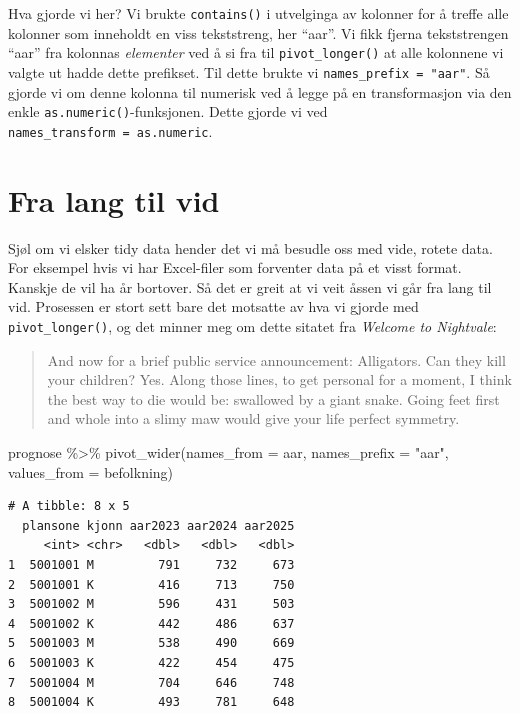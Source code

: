 \documentclass[
  letterpaper,
  DIV=11,
  numbers=noendperiod]{scrreprt}
\newenvironment{Shaded}{\begin{snugshade}}{\end{snugshade}}
\newcommand{\AttributeTok}[1]{\textcolor[rgb]{0.40,0.45,0.13}{#1}}
\newcommand{\FunctionTok}[1]{\textcolor[rgb]{0.28,0.35,0.67}{#1}}
\newcommand{\NormalTok}[1]{\textcolor[rgb]{0.00,0.23,0.31}{#1}}
\newcommand{\SpecialCharTok}[1]{\textcolor[rgb]{0.37,0.37,0.37}{#1}}
\newcommand{\StringTok}[1]{\textcolor[rgb]{0.13,0.47,0.30}{#1}}
\begin{document}
Hva gjorde vi her? Vi brukte \texttt{contains()} i utvelginga av
kolonner for å treffe alle kolonner som inneholdt en viss tekststreng,
her ``aar''. Vi fikk fjerna tekststrengen ``aar'' fra kolonnas
\emph{elementer} ved å si fra til \texttt{pivot\_longer()} at alle
kolonnene vi valgte ut hadde dette prefikset. Til dette brukte vi
\texttt{names\_prefix\ =\ "aar"}. Så gjorde vi om denne kolonna til
numerisk ved å legge på en transformasjon via den enkle
\texttt{as.numeric()}-funksjonen. Dette gjorde vi ved
\texttt{names\_transform\ =\ as.numeric}.

\hypertarget{fra-lang-til-vid}{%
\section{Fra lang til vid}\label{fra-lang-til-vid}}

Sjøl om vi elsker tidy data hender det vi må besudle oss med vide,
rotete data. For eksempel hvis vi har Excel-filer som forventer data på
et visst format. Kanskje de vil ha år bortover. Så det er greit at vi
veit åssen vi går fra lang til vid. Prosessen er stort sett bare det
motsatte av hva vi gjorde med \texttt{pivot\_longer()}, og det minner
meg om dette sitatet fra \emph{Welcome to Nightvale}:

\begin{quote}
And now for a brief public service announcement: Alligators. Can they
kill your children? Yes. Along those lines, to get personal for a
moment, I think the best way to die would be: swallowed by a giant
snake. Going feet first and whole into a slimy maw would give your life
perfect symmetry.
\end{quote}

\begin{Shaded}
\begin{Highlighting}[]
\NormalTok{prognose }\SpecialCharTok{\%\textgreater{}\%} \FunctionTok{pivot\_wider}\NormalTok{(}\AttributeTok{names\_from =}\NormalTok{ aar,}
                         \AttributeTok{names\_prefix =} \StringTok{"aar"}\NormalTok{,}
                         \AttributeTok{values\_from =}\NormalTok{ befolkning)}
\end{Highlighting}
\end{Shaded}

\begin{verbatim}
# A tibble: 8 x 5
  plansone kjonn aar2023 aar2024 aar2025
     <int> <chr>   <dbl>   <dbl>   <dbl>
1  5001001 M         791     732     673
2  5001001 K         416     713     750
3  5001002 M         596     431     503
4  5001002 K         442     486     637
5  5001003 M         538     490     669
6  5001003 K         422     454     475
7  5001004 M         704     646     748
8  5001004 K         493     781     648
\end{verbatim}
\end{document}
